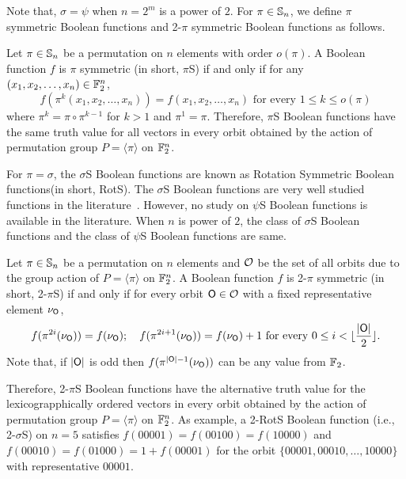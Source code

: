 \documentclass{llncs}
\begin{document}
Note that, $\sigma = \psi$ when $n = 2^m$ is a power of $2$.
For $\pi\in \mathbb{S}_n$, we define $\pi$ symmetric Boolean functions and 2-$\pi$ symmetric Boolean functions as follows.
\begin{definition}\label{def:PSBF}
Let $\pi \in \mathbb{S}_n$ be a permutation on $n$ elements with order $o(\pi)$.
A Boolean function $f$ is $\pi$ symmetric (in short, $\pi$S) if and only if for any $(x_1,x_2,\ldots,x_n)\in \mathbb{F}_2^n$, $$f(\pi^k(x_1,x_2,\ldots,x_n))= f(x_1,x_2,\ldots,x_n) \text{ for every } 1 \leq k \leq o(\pi)$$ where $\pi^k = \pi \circ \pi^{k-1}$ for $k > 1$ and $\pi^1 = \pi$.
Therefore, $\pi$S Boolean functions have the same truth value for all vectors in every orbit obtained by the action of permutation group $P = \langle \pi \rangle$ on $\mathbb{F}_2^n$. 
\end{definition}
For $\pi = \sigma$, the $\sigma$S Boolean functions are known as Rotation Symmetric Boolean functions(in short, RotS). The $\sigma$S Boolean functions are very well studied functions in the literature~\cite{JUSC:PQ99,DM:CS02,DAM:SM08}. However, no study on $\psi$S Boolean functions is available in the literature. When $n$ is power of $2$, the class of $\sigma$S Boolean functions and the class of $\psi$S Boolean functions are same.

\begin{definition}\label{def:2PSBF}
Let $\pi \in \mathbb{S}_n$ be a permutation on $n$ elements and $\mathcal{O}$ be the set of all orbits due to the group action of $P = \langle \pi \rangle$ on $\mathbb{F}_2^n$.
A Boolean function $f$ is 2-$\pi$ symmetric (in short, 2-$\pi$S) if and only if for every orbit $\mathsf{O} \in \mathcal{O}$ with a fixed representative element $\nu_{\mathsf{O}}$,
$$f(\pi^{2i}(\nu_{\mathsf{O}})) = f(\nu_{\mathsf{O}});~~~ f(\pi^{2i+1}(\nu_{\mathsf{O}})) = f(\nu_{\mathsf{O}})+1 \text{ for every } 0 \leq i < \lfloor\frac{|\mathsf{O}|}{2}\rfloor.$$
Note that, if $|\mathsf{O}|$ is odd then $f(\pi^{|\mathsf{O}|-1}(\nu_{\mathsf{O}}))$ can be any value from $\mathbb{F}_2$.
\end{definition}
Therefore, 2-$\pi$S Boolean functions have the alternative truth value for the lexicograpphically ordered vectors in every orbit obtained by the action of permutation group $P = \langle \pi \rangle$ on $\mathbb{F}_2^n$. 
As example, a 2-RotS Boolean function (i.e., 2-$\sigma$S) on $n = 5$ satisfies $f(00001) = f(00100) = f(10000)$ and $f(00010) = f(01000) = 1+f(00001)$ for the orbit $\{00001, 00010, \ldots, 10000\}$ with representative  $00001$.
\end{document}
